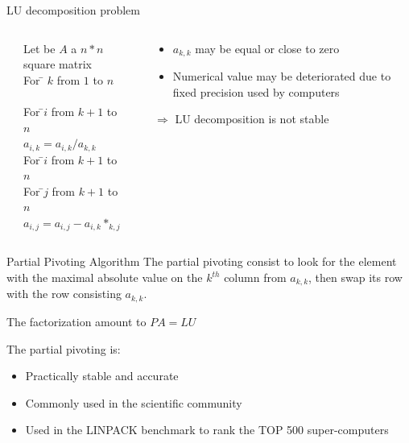 \begin{frame}{LU decomposition problem}
\begin{columns}[c]
\begin{column}{0.02\textwidth}
\end{column}
\begin{column}{0.45\textwidth}
\begin{tabbing}
Let be $A$ a $n*n$ square matrix\\
For \= $k$ from $1$ to $n$\\
\>\\
\> For \=$i$ from $k+1$ to $n$\\
\>\> $a_{i,k} = a_{i,k}/a_{k,k}$\\
\> For \=$i$ from $k+1$ to $n$\\
\>\> For \=$j$ from $k+1$ to $n$\\
\>\>\> $a_{i,j} = a_{i,j}-a_{i,k}*_{k,j}$\\
\end{tabbing}
\end{column}
\begin{column}{0.02\textwidth}
\end{column}
\begin{column}{0.45\textwidth}
\begin{scriptsize}
\begin{itemize}
\item $a_{k,k}$ may be equal or close to zero
\item Numerical value may be deteriorated due to fixed precision used by computers
\end{itemize}
\pause
$\Rightarrow$ LU decomposition is not stable
\end{scriptsize}
\end{column}
\end{columns}
\end{frame}

\begin{frame}{Partial Pivoting Algorithm}
The partial pivoting consist to look for the element with the maximal absolute value on the $k^{th}$ column from $a_{k,k}$, then swap its row with the row consisting $a_{k,k}$.
\begin{flushleft}
The factorization amount to $PA=LU$
\end{flushleft}
\begin{flushleft}
The partial pivoting is:
\begin{itemize}
\item Practically stable and accurate
\item Commonly used in the scientific community
\item Used in the LINPACK benchmark to rank the TOP 500 super-computers
\end{itemize}
\end{flushleft}
\end{frame}

